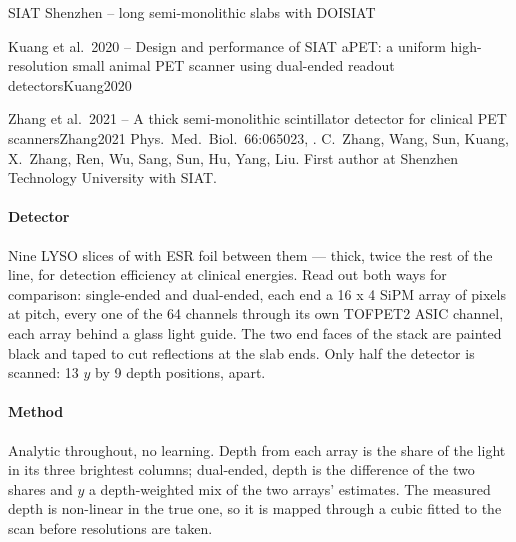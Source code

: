 \begin{programnote}{SIAT Shenzhen -- long semi-monolithic slabs with DOI}{SIAT}
\begin{papernote}{Kuang et al.\ 2020 -- Design and performance of SIAT aPET: a uniform high-resolution small animal PET scanner using dual-ended readout detectors}{Kuang2020}
\end{papernote}

\begin{papernote}{Zhang et al.\ 2021 -- A thick semi-monolithic scintillator detector for clinical PET scanners}{Zhang2021}
Phys.\ Med.\ Biol.\ 66:065023, . C.\ Zhang, Wang,
Sun, Kuang, X.\ Zhang, Ren, Wu, Sang, Sun, Hu, Yang, Liu. First author at
Shenzhen Technology University with SIAT.

\paragraph{Detector}
Nine LYSO slices of  with  ESR foil
between them ---  thick, twice the rest of the line, for detection
efficiency at clinical energies. Read out both ways for comparison: single-ended
and dual-ended, each end a 16 x 4 SiPM array of 
pixels at  pitch, every one of the 64 channels through its own TOFPET2
ASIC channel, each array behind a  glass light guide. The two end faces
of the stack are painted black and taped to cut reflections at the slab ends.
Only half the detector is scanned: 13 $y$ by 9 depth positions,  apart.

\paragraph{Method}
Analytic throughout, no learning. Depth from each array is the share of the
light in its three brightest columns; dual-ended, depth is the difference of
the two shares and $y$ a depth-weighted mix of the two arrays' estimates. The
measured depth is non-linear in the true one, so it is mapped through a cubic
fitted to the scan before resolutions are taken.


\end{papernote}
\end{programnote}
